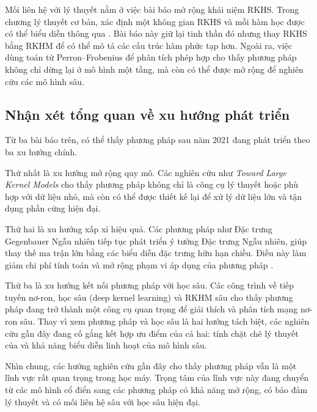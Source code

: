 Mối liên hệ với lý thuyết  nằm ở việc bài báo mở rộng khái niệm
RKHS. Trong chương lý thuyết cơ bản,  xác định một không gian RKHS
và mỗi hàm học được có thể biểu diễn thông qua . Bài báo này giữ
lại tinh thần đó nhưng thay RKHS bằng RKHM để có thể mô tả các cấu trúc hàm
phức tạp hơn. Ngoài ra, việc dùng toán tử Perron--Frobenius để phân tích phép
hợp cho thấy phương pháp  không chỉ dừng lại ở mô hình một tầng, mà
còn có thể được mở rộng để nghiên cứu các mô hình sâu.

\subsection{Nhận xét tổng quan về xu hướng phát triển}

Từ ba bài báo trên, có thể thấy phương pháp  sau năm 2021 đang phát
triển theo ba xu hướng chính.

Thứ nhất là xu hướng mở rộng quy mô. Các nghiên cứu như
\emph{Toward Large Kernel Models} cho thấy phương pháp  không chỉ
là công cụ lý thuyết hoặc phù hợp với dữ liệu nhỏ, mà còn có thể được thiết kế
lại để xử lý dữ liệu lớn và tận dụng phần cứng hiện đại.

Thứ hai là xu hướng xấp xỉ  hiệu quả. Các phương pháp như Đặc trưng
Gegenbauer Ngẫu nhiên tiếp tục phát triển ý tưởng Đặc trưng Ngẫu nhiên, giúp
thay thế ma trận  lớn bằng các biểu diễn đặc trưng hữu hạn chiều.
Điều này làm giảm chi phí tính toán và mở rộng phạm vi áp dụng của phương pháp
.

Thứ ba là xu hướng kết nối phương pháp  với học sâu. Các công trình
về  tiếp tuyến nơ-ron, học  sâu (deep kernel learning)
và RKHM sâu cho thấy phương pháp  đang trở thành một công cụ quan
trọng để giải thích và phân tích mạng nơ-ron sâu. Thay vì xem phương pháp
 và học sâu là hai hướng tách biệt, các nghiên cứu gần đây đang cố
gắng kết hợp ưu điểm của cả hai: tính chặt chẽ lý thuyết của  và
khả năng biểu diễn linh hoạt của mô hình sâu.

Nhìn chung, các hướng nghiên cứu gần đây cho thấy phương pháp  vẫn
là một lĩnh vực rất quan trọng trong học máy. Trọng tâm của lĩnh vực này đang
chuyển từ các mô hình  cổ điển sang các phương pháp  có
khả năng mở rộng, có bảo đảm lý thuyết và có mối liên hệ sâu với học sâu hiện
đại.
